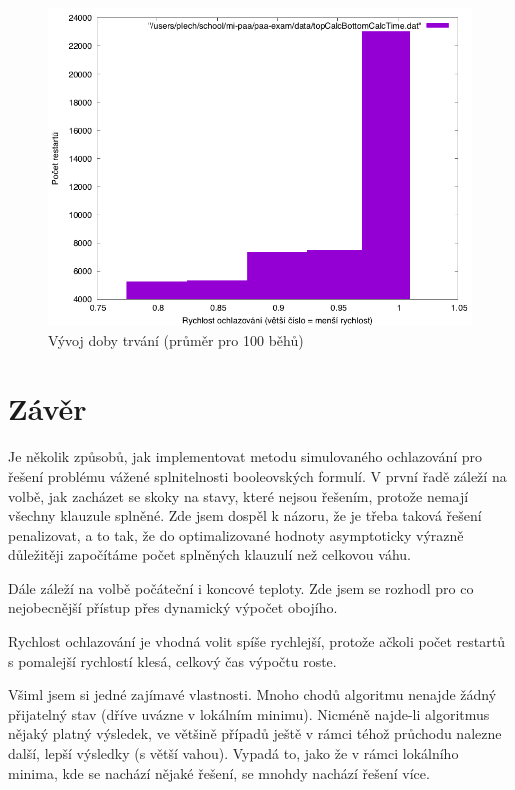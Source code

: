 \documentclass[12pt,a4paper]{article}
\begin{document}
\begin{figure}[H]
\includegraphics[width=\textwidth]{topCalcBottomCalcTime}
\caption{Vývoj doby trvání (průměr pro 100 běhů)}
\label{topCalcBottomCalcTime}
\end{figure}










\section{Závěr}

Je několik způsobů, jak implementovat metodu simulovaného ochlazování pro řešení problému vážené splnitelnosti booleovských formulí. V první řadě záleží na volbě, jak zacházet se skoky na stavy, které nejsou řešením, protože nemají všechny klauzule splněné. Zde jsem dospěl k názoru, že je třeba taková řešení penalizovat, a to tak, že do optimalizované hodnoty asymptoticky výrazně důležitěji započítáme počet splněných klauzulí než celkovou váhu. 

Dále záleží na volbě počáteční i koncové teploty. Zde jsem se rozhodl pro co nejobecnější přístup přes dynamický výpočet obojího.

Rychlost ochlazování je vhodná volit spíše rychlejší, protože ačkoli počet restartů s pomalejší rychlostí klesá, celkový čas výpočtu roste.

Všiml jsem si jedné zajímavé vlastnosti. Mnoho chodů algoritmu nenajde žádný přijatelný stav (dříve uvázne v lokálním minimu). Nicméně najde-li algoritmus nějaký platný výsledek, ve většině případů ještě v rámci téhož průchodu nalezne další, lepší výsledky (s větší vahou). Vypadá to, jako že v rámci lokálního minima, kde se nachází nějaké řešení, se mnohdy nachází řešení více.
\end{document}
